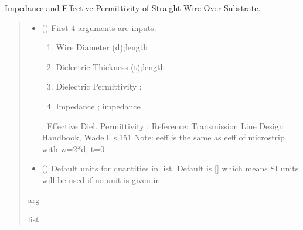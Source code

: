 \documentclass[letterpaper,10pt,english]{sphinxmanual}
\begin{document}

\begin{fulllineitems}
\label{\detokenize{components:components.Zo_eeff_WireOnGroundedSubstrate}}
\pysigstartsignatures
{}
\pysigstopsignatures
\sphinxAtStartPar
Impedance and Effective Permittivity of Straight Wire Over Substrate.
\begin{quote}\begin{description}
\begin{itemize}
\item {}
\sphinxAtStartPar
{} () \textendash{}
\sphinxAtStartPar
First 4 arguments are inputs.
\begin{enumerate}
%
\item {}
\sphinxAtStartPar
Wire Diameter (d);length

\item {}
\sphinxAtStartPar
Dielectric Thickness (t);length

\item {}
\sphinxAtStartPar
Dielectric Permittivity ;

\item {}
\sphinxAtStartPar
Impedance ; impedance

\end{enumerate}

.  Effective Diel. Permittivity ;
Reference:  Transmission Line Design Handbook, Wadell, s.151
Note: eeff is the same as eeff of microstrip with w=2*d, t=0


\item {}
\sphinxAtStartPar
{} (\sphinxstyleliteralemphasis{\sphinxupquote{, }}) \textendash{} Default units for quantities in  list. Default is {[}{]} which means SI units will be used if no unit is given in .

\end{itemize}

\sphinxAtStartPar
arg

\sphinxAtStartPar
list

\end{description}\end{quote}

\end{fulllineitems}
\end{document}
